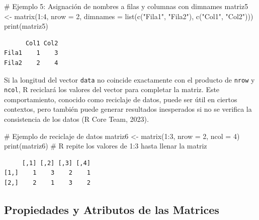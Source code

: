 \documentclass[
  spanish,
  a4paper,
  DIV=11,
  numbers=noendperiod,
  onepage,
  openany]{scrreprt}
\newenvironment{Shaded}{\begin{snugshade}}{\end{snugshade}}
\newcommand{\AttributeTok}[1]{\textcolor[rgb]{0.40,0.45,0.13}{#1}}
\newcommand{\CommentTok}[1]{\textcolor[rgb]{0.37,0.37,0.37}{#1}}
\newcommand{\DecValTok}[1]{\textcolor[rgb]{0.68,0.00,0.00}{#1}}
\newcommand{\FunctionTok}[1]{\textcolor[rgb]{0.28,0.35,0.67}{#1}}
\newcommand{\NormalTok}[1]{\textcolor[rgb]{0.00,0.23,0.31}{#1}}
\newcommand{\OtherTok}[1]{\textcolor[rgb]{0.00,0.23,0.31}{#1}}
\newcommand{\SpecialCharTok}[1]{\textcolor[rgb]{0.37,0.37,0.37}{#1}}
\newcommand{\StringTok}[1]{\textcolor[rgb]{0.13,0.47,0.30}{#1}}
\begin{document}
\begin{Shaded}
\begin{Highlighting}[]
\CommentTok{\# Ejemplo 5: Asignación de nombres a filas y columnas con dimnames}
\NormalTok{matriz5 }\OtherTok{\textless{}{-}} \FunctionTok{matrix}\NormalTok{(}\DecValTok{1}\SpecialCharTok{:}\DecValTok{4}\NormalTok{, }\AttributeTok{nrow =} \DecValTok{2}\NormalTok{, }
                  \AttributeTok{dimnames =} \FunctionTok{list}\NormalTok{(}\FunctionTok{c}\NormalTok{(}\StringTok{"Fila1"}\NormalTok{, }\StringTok{"Fila2"}\NormalTok{), }
                                  \FunctionTok{c}\NormalTok{(}\StringTok{"Col1"}\NormalTok{, }\StringTok{"Col2"}\NormalTok{)))}
\FunctionTok{print}\NormalTok{(matriz5)}
\end{Highlighting}
\end{Shaded}

\begin{verbatim}
      Col1 Col2
Fila1    1    3
Fila2    2    4
\end{verbatim}

Si la longitud del vector \texttt{data} no coincide exactamente con el
producto de \texttt{nrow} y \texttt{ncol}, R reciclará los valores del
vector para completar la matriz. Este comportamiento, conocido como
reciclaje de datos, puede ser útil en ciertos contextos, pero también
puede generar resultados inesperados si no se verifica la consistencia
de los datos (R Core Team, 2023).

\begin{Shaded}
\begin{Highlighting}[]
\CommentTok{\# Ejemplo de reciclaje de datos}
\NormalTok{matriz6 }\OtherTok{\textless{}{-}} \FunctionTok{matrix}\NormalTok{(}\DecValTok{1}\SpecialCharTok{:}\DecValTok{3}\NormalTok{, }\AttributeTok{nrow =} \DecValTok{2}\NormalTok{, }\AttributeTok{ncol =} \DecValTok{4}\NormalTok{)}
\FunctionTok{print}\NormalTok{(matriz6) }\CommentTok{\# R repite los valores de 1:3 hasta llenar la matriz}
\end{Highlighting}
\end{Shaded}

\begin{verbatim}
     [,1] [,2] [,3] [,4]
[1,]    1    3    2    1
[2,]    2    1    3    2
\end{verbatim}

\subsection{Propiedades y Atributos de las
Matrices}\label{propiedades-y-atributos-de-las-matrices}
\end{document}
